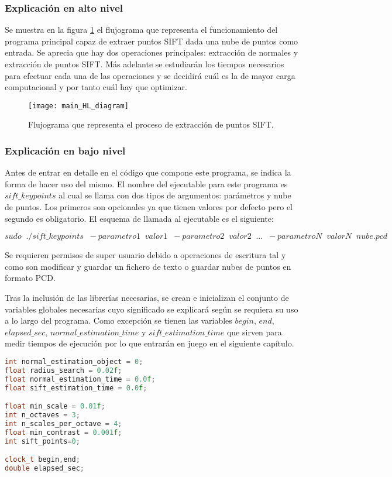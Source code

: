 \subsubsection{Explicación en alto nivel}
Se muestra en la figura \ref{fig:main_HL_diagram} el flujograma que representa el funcionamiento del programa principal capaz de extraer puntos SIFT dada una nube de puntos como entrada. Se aprecia que hay dos operaciones principales: extracción de normales y extracción de puntos SIFT. Más adelante se estudiarán los tiempos necesarios para efectuar cada una de las operaciones y se decidirá cuál es la de mayor carga computacional y por tanto cuál hay que optimizar.

\begin{figure}
\centering
\texttt{[image: main\_HL\_diagram]}
\caption{Flujograma que representa el proceso de extracción de puntos SIFT.}\label{fig:main_HL_diagram}
\end{figure}

\subsubsection{Explicación en bajo nivel}
Antes de entrar en detalle en el código que compone este programa, se indica la forma de hacer uso del mismo. 
El nombre del ejecutable para este programa es $sift\_keypoints$ al cual se llama con dos tipos de argumentos: parámetros y nube de puntos. Los primeros son opcionales ya que tienen valores por defecto pero el segundo es obligatorio. El esquema de llamada al ejecutable es el siguiente:

$$sudo \;\; ./sift\_keypoints \;\; -parametro1 \;\; valor1 \;\; -parametro2 \;\; valor2 \;\; ... \;\; -parametroN \;\; valorN \;\; nube.pcd$$

Se requieren permisos de super usuario debido a operaciones de escritura tal y como son modificar y guardar un fichero de texto o guardar nubes de puntos en formato PCD.


Tras la inclusión de las librerías necesarias, se crean e inicializan el conjunto de variables globales necesarias cuyo significado se explicará según se requiera su uso a lo largo del programa. Como excepción se tienen las variables $begin$, $end$, $elapsed\_sec$, $normal\_estimation\_time$ y $sift\_estimation\_time$ que sirven para medir tiempos de ejecución por lo que entrarán en juego en el siguiente capítulo.

\begin{lstlisting}[language=C++,breaklines]
int normal_estimation_object = 0;
float radius_search = 0.02f;
float normal_estimation_time = 0.0f;
float sift_estimation_time = 0.0f;

float min_scale = 0.01f;
int n_octaves = 3;
int n_scales_per_octave = 4;
float min_contrast = 0.001f;
int sift_points=0; 

clock_t begin,end;
double elapsed_sec;
\end{lstlisting}

